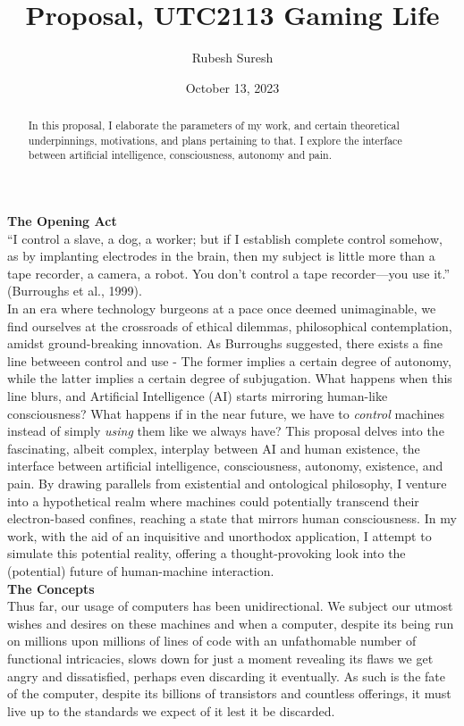 \documentclass[11pt]{article}
\title{Proposal, UTC2113 Gaming Life}
\author{Rubesh Suresh}
\date {October 13, 2023}
\begin{document}
\maketitle

\begin{abstract}
In this proposal, I elaborate the parameters of my work, and certain theoretical underpinnings, motivations, and plans pertaining to that. I explore the interface between artificial intelligence, consciousness, autonomy and pain. \\
\end{abstract}

\textbf{\Large The Opening Act} \\

“I control a slave, a dog, a worker; but if I establish complete control somehow, as by implanting electrodes in the brain, then my subject is little more than a tape recorder, a camera, a robot. You don’t control a tape recorder—you use it.” (Burroughs et al., 1999). \\

In an era where technology burgeons at a pace once deemed unimaginable, we find ourselves at the crossroads of ethical dilemmas, philosophical contemplation, amidst ground-breaking innovation. As Burroughs suggested, there exists a fine line betweeen control and use - The former implies a certain degree of autonomy, while the latter implies a certain degree of subjugation. What happens when this line blurs, and Artificial Intelligence (AI) starts mirroring human-like consciousness? What happens if in the near future, we have to \textit{control} machines instead of simply \textit{using} them like we always have? This proposal delves into the fascinating, albeit complex, interplay between AI and human existence, the interface between artificial intelligence, consciousness, autonomy, existence, and pain. By drawing parallels from existential and ontological philosophy, I venture into a hypothetical realm where machines could potentially transcend their electron-based confines, reaching a state that mirrors human consciousness. In my work, with the aid of an inquisitive and unorthodox application, I attempt to simulate this potential reality, offering a thought-provoking look into the (potential) future of human-machine interaction. \\

\textbf{\Large The Concepts} \\

Thus far, our usage of computers has been unidirectional. We subject our utmost wishes and desires on these machines and when a computer, despite its being run on millions upon millions of lines of code with an unfathomable number of functional intricacies, slows down for just a moment revealing its flaws we get angry and dissatisfied, perhaps even discarding it eventually. As such is the fate of the computer, despite its billions of transistors and countless offerings, it must live up to the standards we expect of it lest it be discarded. \\
\end{document}
